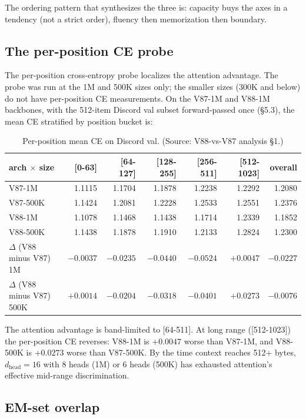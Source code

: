 \documentclass[11pt]{article}
\begin{document}
The ordering pattern that synthesizes the three is: capacity buys the axes in a tendency (not a strict order), fluency then memorization then boundary.

\subsection{The per-position CE probe}

The per-position cross-entropy probe localizes the attention advantage. The probe was run at the 1M and 500K sizes only; the smaller sizes (300K and below) do not have per-position CE measurements. On the V87-1M and V88-1M backbones, with the 512-item Discord val subset forward-passed once (\S5.3), the mean CE stratified by position bucket is:

\begin{table}[!t]
\small
\caption{Per-position mean CE on Discord val. (Source: V88-vs-V87 analysis \S1.)}
\label{tab:perpos-ce}
\centering
\begin{tabular}{lrrrrrr}
\toprule
arch $\times$ size & [0-63] & [64-127] & [128-255] & [256-511] & [512-1023] & overall \\
\midrule
V87-1M  & 1.1115 & 1.1704 & 1.1878 & 1.2238 & 1.2292 & 1.2080 \\
V87-500K & 1.1424 & 1.2081 & 1.2228 & 1.2533 & 1.2551 & 1.2376 \\
V88-1M  & 1.1078 & 1.1468 & 1.1438 & 1.1714 & 1.2339 & 1.1852 \\
V88-500K & 1.1438 & 1.1878 & 1.1910 & 1.2133 & 1.2824 & 1.2300 \\
$\Delta$ (V88 minus V87) 1M & $-0.0037$ & $-0.0235$ & $-0.0440$ & $-0.0524$ & $+0.0047$ & $-0.0227$ \\
$\Delta$ (V88 minus V87) 500K & $+0.0014$ & $-0.0204$ & $-0.0318$ & $-0.0401$ & $+0.0273$ & $-0.0076$ \\
\bottomrule
\end{tabular}
\end{table}

The attention advantage is band-limited to [64-511]. At long range ([512-1023]) the per-position CE reverses: V88-1M is $+0.0047$ worse than V87-1M, and V88-500K is $+0.0273$ worse than V87-500K. By the time context reaches 512+ bytes, $d_{\text{head}} = 16$ with 8 heads (1M) or 6 heads (500K) has exhausted attention's effective mid-range discrimination.

\subsection{EM-set overlap}
\end{document}
